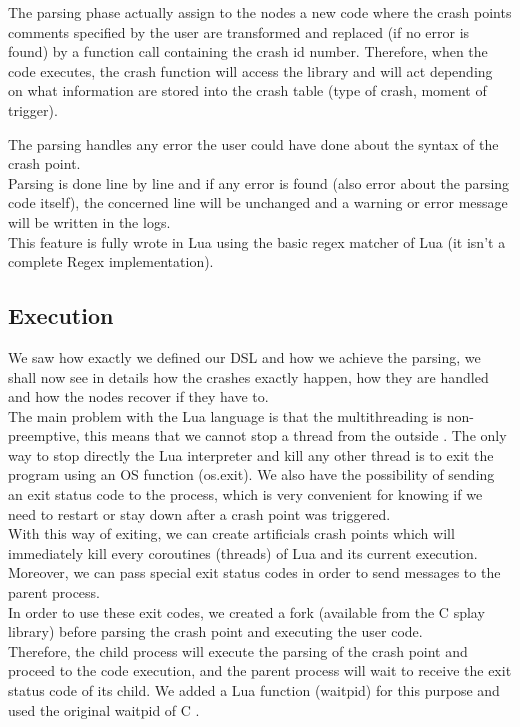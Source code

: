 \documentclass{eplmastersthesis}
\begin{document}
          The parsing phase actually assign to the nodes a new code where the
          crash points comments specified by the user are transformed and
          replaced (if no error is found) by a function call containing the
          crash id number. Therefore, when the code executes, the crash
          function will access the library and will act depending on what
          information are stored into the crash table (type of crash,
          moment of trigger).

          The parsing handles any error the user could have done about the
          syntax of the crash point.\\
          Parsing is done line by line and if any error is found (also error
          about the parsing code itself), the concerned line will be unchanged and
          a warning or error message will be written in the logs.\\
          This feature is fully wrote in Lua using the basic regex matcher of Lua
          \cite{RegexLua} (it isn't a complete Regex implementation).

        \subsection{Execution}

          We saw how exactly we defined our DSL and how we achieve the parsing,
          we shall now see in details how the crashes exactly happen, how they
          are handled and how the nodes recover if they have to.\\

          The main problem with the Lua language is that the multithreading
          is non-preemptive, this means that we cannot stop a thread from the
          outside \cite{CoroutineLua}. The only way to stop directly the Lua
          interpreter and kill any other thread is to exit the program using
          an OS function (os.exit). We also have the possibility of sending an exit
          status code to the process, which is very convenient for knowing
          if we need to restart or stay down after a crash point was
          triggered.\\

          With this way of exiting, we can create artificials crash points which
          will immediately kill every coroutines (threads) of Lua and its
          current execution. Moreover, we can pass special exit status codes
          in order to send messages to the parent process.\\
          In order to use these exit codes, we created a fork (available from
          the C splay library) before parsing the crash point and executing
          the user code.\\
          Therefore, the child process will execute the parsing of the crash
          point and proceed to the code execution, and the parent process will
          wait to receive the exit status code of its child. We added a Lua
          function (waitpid) for this purpose and used the original waitpid
          of C \cite{waitpid}.\\
\end{document}
